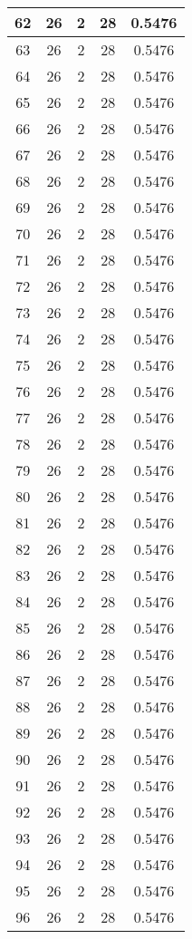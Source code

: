 \documentclass[letterpaper, 12pt]{article}
\begin{document}
\begin{longtable}{|c|c|c|c|c|}
\hline
62 & 26 & 2 & 28 & 0.5476 \\
\hline
63 & 26 & 2 & 28 & 0.5476 \\
\hline
64 & 26 & 2 & 28 & 0.5476 \\
\hline
65 & 26 & 2 & 28 & 0.5476 \\
\hline
66 & 26 & 2 & 28 & 0.5476 \\
\hline
67 & 26 & 2 & 28 & 0.5476 \\
\hline
68 & 26 & 2 & 28 & 0.5476 \\
\hline
69 & 26 & 2 & 28 & 0.5476 \\
\hline
70 & 26 & 2 & 28 & 0.5476 \\
\hline
71 & 26 & 2 & 28 & 0.5476 \\
\hline
72 & 26 & 2 & 28 & 0.5476 \\
\hline
73 & 26 & 2 & 28 & 0.5476 \\
\hline
74 & 26 & 2 & 28 & 0.5476 \\
\hline
75 & 26 & 2 & 28 & 0.5476 \\
\hline
76 & 26 & 2 & 28 & 0.5476 \\
\hline
77 & 26 & 2 & 28 & 0.5476 \\
\hline
78 & 26 & 2 & 28 & 0.5476 \\
\hline
79 & 26 & 2 & 28 & 0.5476 \\
\hline
80 & 26 & 2 & 28 & 0.5476 \\
\hline
81 & 26 & 2 & 28 & 0.5476 \\
\hline
82 & 26 & 2 & 28 & 0.5476 \\
\hline
83 & 26 & 2 & 28 & 0.5476 \\
\hline
84 & 26 & 2 & 28 & 0.5476 \\
\hline
85 & 26 & 2 & 28 & 0.5476 \\
\hline
86 & 26 & 2 & 28 & 0.5476 \\
\hline
87 & 26 & 2 & 28 & 0.5476 \\
\hline
88 & 26 & 2 & 28 & 0.5476 \\
\hline
89 & 26 & 2 & 28 & 0.5476 \\
\hline
90 & 26 & 2 & 28 & 0.5476 \\
\hline
91 & 26 & 2 & 28 & 0.5476 \\
\hline
92 & 26 & 2 & 28 & 0.5476 \\
\hline
93 & 26 & 2 & 28 & 0.5476 \\
\hline
94 & 26 & 2 & 28 & 0.5476 \\
\hline
95 & 26 & 2 & 28 & 0.5476 \\
\hline
96 & 26 & 2 & 28 & 0.5476 \\

\end{longtable}
\end{document}
